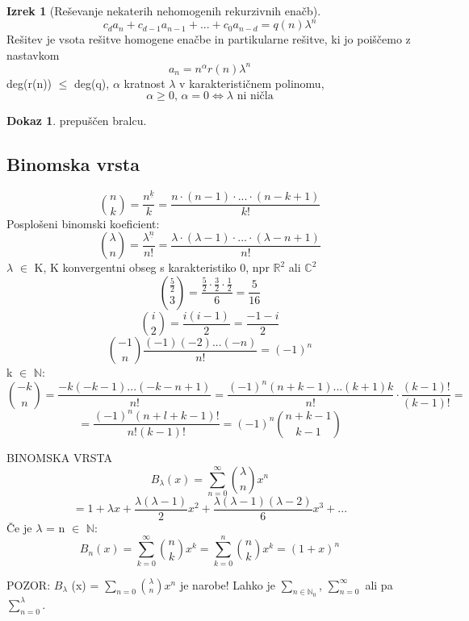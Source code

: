 \documentclass[a4paper,12pt]{article}
\theoremstyle{definition}
\newtheorem{theorem}[counter]{Izrek}
\newtheorem{pro}[counter]{Dokaz}
\theoremstyle{remark}
\newcommand{\N}{\mathbb{N}}
\newcommand{\R}{\mathbb{R}}
\newcommand{\C}{\mathbb{C}}
\begin{document}
\begin{theorem}[Reševanje nekaterih nehomogenih rekurzivnih enačb]
    \[c_d a_n + c_{d - 1} a_{n - 1} + ... + c_0 a_{n - d} = q(n) \lambda^n\]
    Rešitev je vsota rešitve homogene enačbe in partikularne rešitve, ki jo poiščemo z nastavkom
    \[a_n = n^{\alpha} r(n) \lambda^n\]
    deg(r(n)) $\leqslant$ deg(q), $\alpha$ kratnost $\lambda$ v karakterističnem polinomu, 
    \[\alpha \geqslant 0 \text{, } \alpha = 0 \iff \lambda \text{ ni ničla}\]
\end{theorem}

\begin{pro}
    prepuščen bralcu.
\end{pro}


\subsection{Binomska vrsta}

\[\binom{n}{k} = \frac{n^{\underline{k}}}{k} = \frac{n \cdot (n - 1) \cdot ... \cdot (n - k + 1)}{k!}\]
Posplošeni binomski koeficient:
\[\binom{\lambda}{n} = \frac{\lambda^{\underline{n}}}{n!} = \frac{\lambda \cdot (\lambda - 1) \cdot ... \cdot (\lambda - n + 1)}{n!}\]
$\lambda$ $\in$ K, K konvergentni obseg s karakteristiko 0, npr $\R^2$ ali $\C^2$\\
\[\binom{\frac{5}{2}}{3} = \frac{\frac{5}{2} \cdot \frac{3}{2} \cdot \frac{1}{2}}{6} = \frac{5}{16}\]
\[\binom{i}{2} = \frac{i (i - 1)}{2} = \frac{-1 -i}{2}\]
\[\binom{-1}{n} \frac{(-1)(-2)...(-n)}{n!} = (-1)^n\]
k $\in$ $\N$:\\
\[\binom{-k}{n} = \frac{-k (-k - 1) ... (-k - n + 1)}{n!} = \frac{(-1)^n (n + k - 1) ... (k + 1) k}{n!} \cdot \frac{(k - 1)!}{(k - 1)!} = \]
\[ = \frac{(-1)^n (n+l+k-1)!}{n! (k - 1)!} = (-1)^n \binom{n + k - 1}{k - 1}\]

BINOMSKA VRSTA
\[B_{\lambda} (x) = \sum_{n = 0}^{\infty} \binom{\lambda}{n} x^n\]
\[= 1 + \lambda x + \frac{\lambda (\lambda - 1)}{2} x^2 + \frac{\lambda (\lambda - 1) (\lambda - 2)}{6} x^3 + ...\]
Če je $\lambda$ = n $\in$ $\N$:
\[B_n (x) = \sum_{k = 0}^{\infty} \binom{n}{k} x^k = \sum_{k = 0}^n \binom{n}{k} x^k = (1 + x)^n\]

POZOR: $B_{\lambda}$ (x) = $\displaystyle \sum_{n = 0} \binom{\lambda}{n} x^n$ je narobe! Lahko je $\displaystyle \sum_{n \in \N_0}$, $\displaystyle \sum_{n = 0}^{\infty}$ ali pa $\displaystyle \sum_{n = 0}^{\lambda}$.\\
\end{document}

